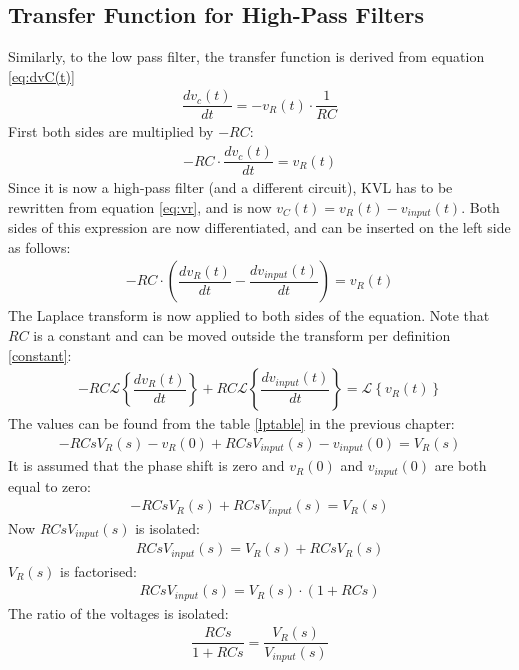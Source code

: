 \subsection{Transfer Function for High-Pass Filters}
Similarly, to the low pass filter, the transfer function is derived from equation \eqref{eq:dvC(t)} 
\begin{align}
\dfrac{dv_{c}(t)}{dt} = -v_{R}(t) \cdot \dfrac{1}{RC}
\end{align}
First both sides are multiplied by $-RC$:
\begin{align}
-RC \cdot \dfrac{dv_{c}(t)}{dt} = v_{R}(t)
\end{align}
Since it is now a high-pass filter (and a different circuit), KVL has to be rewritten from equation \eqref{eq:vr}, and is now $v_{C}(t)=v_{R}(t)-v_{input}(t)$. Both sides of this expression are now differentiated, and can be inserted on the left side as follows:
\begin{align*}
-RC \cdot \left(\dfrac{dv_{R}(t)}{dt} - \dfrac{dv_{input}(t)}{dt} \right) = v_{R}(t)
\end{align*}
The Laplace transform is now applied to both sides of the equation. Note that $RC$ is a constant and can be moved outside the transform per definition \ref{constant}:
\begin{align*}
-RC \mathcal{L} \left\{\dfrac{dv_{R}(t)}{dt} \right\} + RC \mathcal{L} \left\{ \dfrac{dv_{input}(t)}{dt} \right\} = \mathcal{L} \left\{v_{R}(t) \right\}
\end{align*}
The values can be found from the table \ref{lptable} in the previous chapter:
\begin{align*}
-RCsV_{R}(s)-v_{R}(0) + RCsV_{input}(s)-v_{input}(0) = V_{R}(s)
\end{align*}
It is assumed that the phase shift is zero and $v_{R}(0)$ and $v_{input}(0)$ are both equal to zero:
\begin{align*}
-RCsV_{R}(s) + RCsV_{input}(s) = V_{R}(s)
\end{align*}
Now $RCs V_{input}(s)$ is isolated:
\begin{align*}
RCsV_{input}(s) = V_{R}(s) + RCsV_{R}(s)
\end{align*}
$V_{R}(s)$ is factorised:
\begin{align*}
RCsV_{input}(s) = V_{R}(s) \cdot (1 + RCs)
\end{align*}
The ratio of the voltages is isolated:
\begin{align} \label{hp:visolated}
\dfrac{RCs}{1 + RCs} = \dfrac{V_{R}(s)}{V_{input}(s)}
\end{align}
